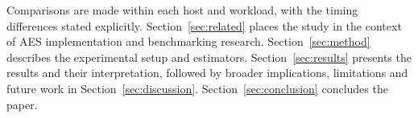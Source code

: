 Comparisons are made within each host and workload, with the timing differences stated explicitly. Section~\ref{sec:related} places the study in the context of AES implementation and benchmarking research. Section~\ref{sec:method} describes the experimental setup and estimators. Section~\ref{sec:results} presents the results and their interpretation, followed by broader implications, limitations and future work in Section~\ref{sec:discussion}. Section~\ref{sec:conclusion} concludes the paper.

